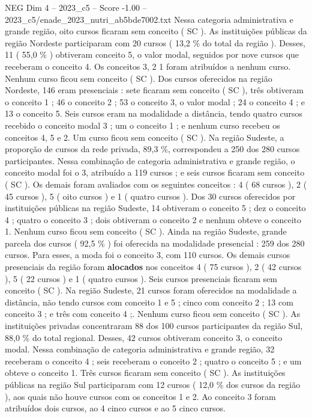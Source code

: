 \begin{textsample}{NEG Dim 4 – 2023\_c5 – Score -1.00 – 2023\_c5/enade\_2023\_nutri\_ab5bde7002.txt}
Nessa categoria administrativa e grande região, oito cursos ficaram sem conceito ( SC ).
As instituições públicas da região Nordeste participaram com 20 cursos ( 13,2 \% do total da região ).
Desses, 11 ( 55,0 \% ) obtiveram conceito 5, o valor modal, seguidos por nove cursos que receberam o conceito 4.
Os conceitos 3, 2 1 foram atribuídos a nenhum curso.
Nenhum curso ficou sem conceito ( SC ).
Dos cursos oferecidos na região Nordeste, 146 eram presenciais : sete ficaram sem conceito ( SC ), três obtiveram o conceito 1 ; 46 o conceito 2 ; 53 o conceito 3, o valor modal ; 24 o conceito 4 ; e 13 o conceito 5.
Seis cursos eram na modalidade a distância, tendo quatro cursos recebido o conceito modal 3 ; um o conceito 1 ; e nenhum curso recebeu os conceitos 4, 5 e 2.
Um curso ficou sem conceito ( SC ).
Na região Sudeste, a proporção de cursos da rede privada, 89,3 \%, correspondeu a 250 dos 280 cursos participantes.
Nessa combinação de categoria administrativa e grande região, o conceito modal foi o 3, atribuído a 119 cursos ; e seis cursos ficaram sem conceito ( SC ).
Os demais foram avaliados com os seguintes conceitos : 4 ( 68 cursos ), 2 ( 45 cursos ), 5 ( oito cursos ) e 1 ( quatro cursos ).
Dos 30 cursos oferecidos por instituições públicas na região Sudeste, 14 obtiveram o conceito 5 ; dez o conceito 4 ; quatro o conceito 3 ; dois obtiveram o conceito 2 e nenhum obteve o conceito 1.
Nenhum curso ficou sem conceito ( SC ).
Ainda na região Sudeste, grande parcela dos cursos ( 92,5 \% ) foi oferecida na modalidade presencial : 259 dos 280 cursos.
Para esses, a moda foi o conceito 3, com 110 cursos.
Os demais cursos presenciais da região foram \textbf{alocados} nos conceitos 4 ( 75 cursos ), 2 ( 42 cursos ), 5 ( 22 cursos ) e 1 ( quatro cursos ).
Seis cursos presenciais ficaram sem conceito ( SC ).
Na região Sudeste, 21 cursos foram oferecidos na modalidade a distância, não tendo cursos com conceito 1 e 5 ; cinco com conceito 2 ; 13 com conceito 3 ; e três com conceito 4 ;.
Nenhum curso ficou sem conceito ( SC ).
As instituições privadas concentraram 88 dos 100 cursos participantes da região Sul, 88,0 \% do total regional.
Desses, 42 cursos obtiveram conceito 3, o conceito modal.
Nessa combinação de categoria administrativa e grande região, 32 receberam o conceito 4 ; seis receberam o conceito 2 ; quatro o conceito 5 ; e um obteve o conceito 1.
Três cursos ficaram sem conceito ( SC ).
As instituições públicas na região Sul participaram com 12 cursos ( 12,0 \% dos cursos da região ), aos quais não houve cursos com os conceitos 1 e 2.
Ao conceito 3 foram atribuídos dois cursos, ao 4 cinco cursos e ao 5 cinco cursos.

\end{textsample}
